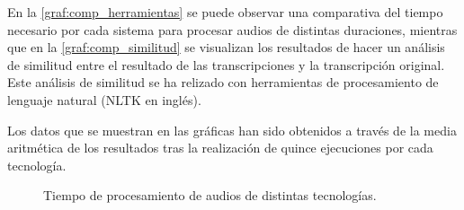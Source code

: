 \documentclass[../main.tex]{subfiles}
\begin{document}
En la \autoref{graf:comp_herramientas} se puede observar una comparativa del tiempo necesario por cada sistema para procesar audios de distintas duraciones, mientras que en la \autoref{graf:comp_similitud} se visualizan los resultados de hacer un análisis de similitud entre el resultado de las transcripciones y la transcripción original. Este análisis de similitud se ha relizado con herramientas de procesamiento de lenguaje natural (NLTK en inglés).

Los datos que se muestran en las gráficas han sido obtenidos a través de la media aritmética de los resultados tras la realización de quince ejecuciones por cada tecnología.


\begin{figure}[H]
  \begin{center}
    \caption{Tiempo de procesamiento de audios de distintas tecnologías.}
    \label{graf:comp_herramientas}
  \end{center}
\end{figure}



\data
\end{document}
